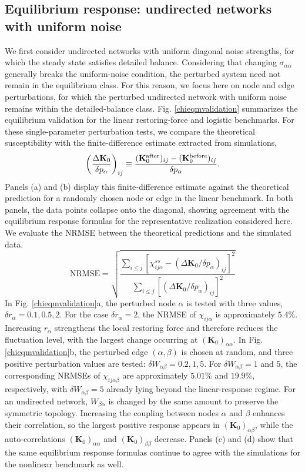 \subsection{Equilibrium response: undirected networks with uniform noise}
\quad We first consider undirected networks with uniform diagonal noise strengths, for which the steady state satisfies detailed balance. Considering that changing $\sigma_{\alpha\alpha}$ generally breaks the uniform-noise condition, the perturbed system need not remain in the equilibrium class. For this reason, we focus here on node and edge perturbations, for which the perturbed undirected network with uniform noise remains within the detailed-balance class. Fig. \ref{chieqmvalidation} summarizes the equilibrium validation for the linear restoring-force and logistic benchmarks. For these single-parameter perturbation tests, we compare the theoretical susceptibility with the finite-difference estimate extracted from simulations,
\begin{equation}
    \left(\frac{\Delta \mathbf{K}_0}{\delta p_\alpha}\right)_{ij}
    \equiv
    \frac{(\mathbf{K}_0^{\rm after})_{ij}-(\mathbf{K}_0^{\rm before})_{ij}}{\delta p_\alpha}.
\end{equation}
Panels (a) and (b) display this finite-difference estimate against the theoretical prediction for a randomly chosen node or edge in the linear benchmark. In both panels, the data points collapse onto the diagonal, showing agreement with the equilibrium response formulas for the representative realization considered here. We evaluate the NRMSE between the theoretical predictions and the simulated data.
\[
    \text{NRMSE} = \sqrt{\frac{\sum_{i\le j} \left[\chi^{ss}_{ij\alpha}-\left(\Delta \mathbf{K}_0/\delta p_\alpha\right)_{ij}\right]^2 }{\sum_{i\le j} \left[\left(\Delta \mathbf{K}_0/\delta p_\alpha\right)_{ij}\right]^2}}
\]
In Fig. \ref{chieqmvalidation}a, the perturbed node $\alpha$ is tested with three values, $\delta r_\alpha = 0.1, 0.5, 2$. For the case $\delta r_\alpha=2$, the NRMSE of $\chi_{ij\alpha}$ is approximately $5.4\%$. Increasing $r_\alpha$ strengthens the local restoring force and therefore reduces the fluctuation level, with the largest change occurring at $(\mathbf{K}_0)_{\alpha\alpha}$. In Fig. \ref{chieqmvalidation}b, the perturbed edge $(\alpha,\beta)$ is chosen at random, and three positive perturbation values are tested: $\delta W_{\alpha\beta} = 0.2, 1, 5$. For $\delta W_{\alpha\beta}=1$ and $5$, the corresponding NRMSEs of $\chi_{ij\alpha\beta}$ are approximately $5.01\%$ and $19.9\%$, respectively, with $\delta W_{\alpha\beta}=5$ already lying beyond the linear-response regime. For an undirected network, $W_{\beta\alpha}$ is changed by the same amount to preserve the symmetric topology. Increasing the coupling between nodes $\alpha$ and $\beta$ enhances their correlation, so the largest positive response appears in $(\mathbf{K}_0)_{\alpha\beta}$, while the auto-correlations $(\mathbf{K}_0)_{\alpha\alpha}$ and $(\mathbf{K}_0)_{\beta\beta}$ decrease. Panels (c) and (d) show that the same equilibrium response formulas continue to agree with the simulations for the nonlinear benchmark as well.
